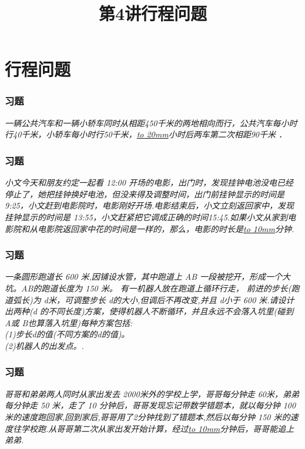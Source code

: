 \section{行程问题}

\title[第4讲\quad 行程问题]{第4讲\quad 行程问题} 
\author{}
\date{}

\begin{frame}
    \titlepage
\end{frame}

\setcounter{framecounter}{0}

\begin{frame}
    \frametitle{习题\theframecounter}
    \vspace*{-3cm}
    \textit{一辆公共汽车和一辆小轿车同时从相距450千米的两地相向而行，公共汽车每小时行40千米，小轿车每小时行50千米，\underline{\hbox to 20mm{}}小时后两车第二次相距90千米 ．} 
\end{frame}

\begin{frame}
    \frametitle{习题\theframecounter}
    \vspace*{-3cm}
    \textit{小文今天和朋友约定一起看 12:00 开场的电影，出门时，发现挂钟电池没电已经停止了，她把挂钟换好电池，但没来得及调整时间，出门前挂钟显示的时间是 9:25，小文赶到电影院时，电影刚好开场.电影结束后，小文立刻返回家中，发现挂钟显示的时间是 13:55，小文赶紧把它调成正确的时间15:45.如果小文从家到电影院和从电影院返回家中花的时间是一样的，那么，电影的时长是\underline{\hbox to 10mm{}}分钟.}
\end{frame}


\begin{frame}
    \frametitle{习题\theframecounter}
    \vspace*{-1cm}
    \textit{一条圆形跑道长 600 米,因铺设水管，其中跑道上 AB 一段被挖开，形成一个大坑。AB的跑道长度为 150 米。 有一机器人放在跑道上循环行走， 前进的步长(跑道弧长)为 d米，可调整步长 d的大小,但调后不再改变,并且 d小于 600 米.请设计出两种(d 的不同长度)方案，使得机器人不断循环，并且永远不会落入坑里(碰到 A或 B也算落入坑里)每种方案包括:\\
    (1)步长d的值(不同方案的d的值)。\\
    (2)机器人的出发点。.}
\end{frame}

\begin{frame}
    \frametitle{习题\theframecounter}
    \vspace*{-3cm}
    \textit{哥哥和弟弟两人同时从家出发去 2000米外的学校上学，哥哥每分钟走 60米，弟弟每分钟走 50 米，走了 10 分钟后，哥哥发现忘记带数学错题本，就以每分钟 100 米的速度跑回家,回到家后,哥哥用了2分钟找到了错题本,然后以每分钟 150 米的速度往学校跑.从哥哥第二次从家出发开始计算，经过\underline{\hbox to 10mm{}}分钟后，哥哥能追上弟弟.}
\end{frame}

